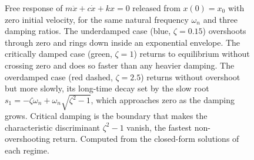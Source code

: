 \begin{figure}[htbp]
\centering
{}
\caption[Free response in the three damping regimes]{Free response of
$m\ddot{x}+c\dot{x}+kx=0$ released from $x(0)=x_0$ with zero initial
velocity, for the same natural frequency $\omega_n$ and three damping
ratios. The underdamped case (blue, $\zeta=0.15$) overshoots through
zero and rings down inside an exponential envelope. The critically
damped case (green, $\zeta=1$) returns to equilibrium without crossing
zero and does so faster than any heavier damping. The overdamped case
(red dashed, $\zeta=2.5$) returns without overshoot but more slowly,
its long-time decay set by the slow root $s_1=-\zeta\omega_n+\omega_n
\sqrt{\zeta^2-1}$, which approaches zero as the damping grows. Critical
damping is the boundary that makes the characteristic discriminant
$\zeta^2-1$ vanish, the fastest non-overshooting return. Computed from
the closed-form solutions of each regime.}
\label{fig:vol03ch06:damping-regimes}
\end{figure}
